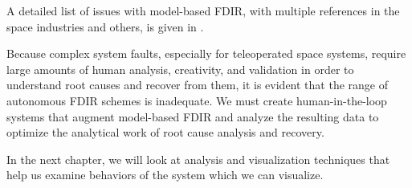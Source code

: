 A detailed list of issues with model-based FDIR, with multiple references in the space industries and others, is given in \cite{kurien2010intrinsic}.

Because complex system faults, especially for teleoperated space systems, require large amounts of human analysis, creativity, and validation in order to understand root causes and recover from them, it is evident that the range of autonomous FDIR schemes is inadequate. We must create human-in-the-loop systems that augment model-based FDIR and analyze the resulting data to optimize the analytical work of root cause analysis and recovery.

In the next chapter, we will look at analysis and visualization techniques that help us examine behaviors of the system which we can visualize.